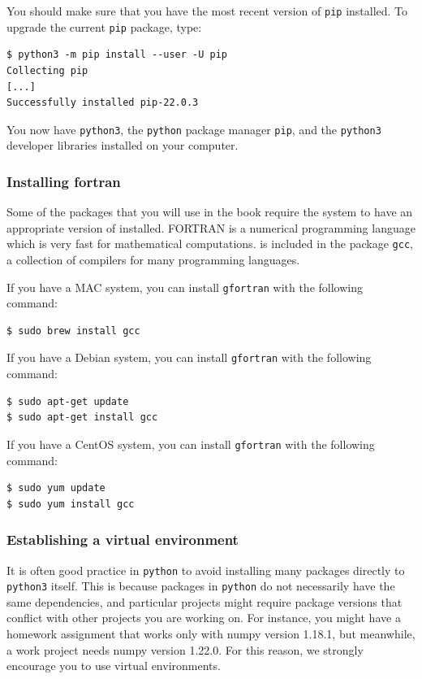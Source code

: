 You should make sure that you have the most recent version of \texttt{pip} installed. To upgrade the current \texttt{pip} package, type:

\begin{lstlisting}[style=bash]
$ python3 -m pip install --user -U pip
Collecting pip
[...]
Successfully installed pip-22.0.3
\end{lstlisting}

You now have \texttt{python3}, the \texttt{python} package manager \texttt{pip}, and the \texttt{python3} developer libraries installed on your computer. 

\subsubsection*{Installing fortran}

Some of the packages that you will use in the book require the system to have an appropriate version of  installed. FORTRAN is a numerical programming language which is very fast for mathematical computations.  is included in the package \texttt{gcc}, a collection of compilers for many programming languages.

If you have a MAC system, you can install \texttt{gfortran} with the following command:

\begin{lstlisting}[style=bash]
$ sudo brew install gcc
\end{lstlisting}

If you have a Debian system, you can install \texttt{gfortran} with the following command:

\begin{lstlisting}[style=bash]
$ sudo apt-get update
$ sudo apt-get install gcc
\end{lstlisting}

If you have a CentOS system, you can install \texttt{gfortran} with the following command:

\begin{lstlisting}[style=bash]
$ sudo yum update
$ sudo yum install gcc
\end{lstlisting}

\subsubsection*{Establishing a virtual environment}

It is often good practice in \texttt{python} to avoid installing many packages directly to \texttt{python3} itself. This is because packages in \texttt{python} do not necessarily have the same dependencies, and particular projects might require package versions that conflict with other projects you are working on. For instance, you might have a homework assignment that works only with numpy version 1.18.1, but meanwhile, a work project needs numpy version 1.22.0. For this reason, we strongly encourage you to use virtual environments.

